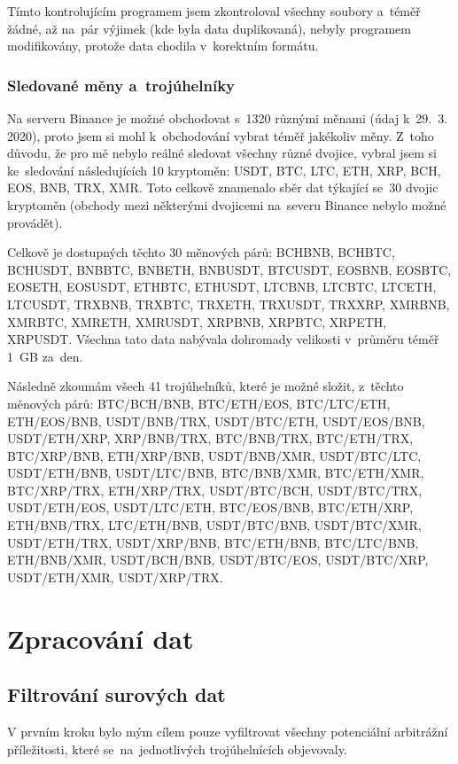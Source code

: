 \documentclass[thesis=B,czech]{FITthesis}[2019/03/21]
\begin{document}
Tímto kontrolujícím programem jsem zkontroloval všechny soubory a~téměř žádné, až na~pár výjimek (kde byla data duplikovaná), nebyly programem modifikovány, protože data chodila v~korektním formátu.

\subsubsection{Sledované měny a~trojúhelníky}
Na serveru Binance je možné obchodovat s~1320 různými měnami (údaj k~29.~3. 2020), proto jsem si mohl k~obchodování vybrat téměř jakékoliv měny. Z~toho důvodu, že pro mě nebylo reálné sledovat všechny různé dvojice, vybral jsem si ke~sledování následujících 10 kryptoměn: USDT, BTC, LTC, ETH, XRP, BCH, EOS, BNB, TRX, XMR. Toto celkově znamenalo sběr dat týkající se~30 dvojic kryptoměn (obchody mezi některými dvojicemi na~severu Binance nebylo možné provádět).

Celkově je dostupných těchto 30 měnových párů: BCHBNB, BCHBTC, BCHUSDT, BNBBTC, BNBETH, BNBUSDT, BTCUSDT, EOSBNB,  \linebreak EOSBTC, EOSETH, EOSUSDT, ETHBTC, ETHUSDT, LTCBNB, LTCBTC, LTCETH, LTCUSDT, TRXBNB, TRXBTC, TRXETH, TRXUSDT,  \linebreak TRXXRP, XMRBNB, XMRBTC, XMRETH, XMRUSDT, XRPBNB,  \linebreak XRPBTC, XRPETH, XRPUSDT. Všechna tato data nabývala dohromady velikosti v~průměru téměř 1~GB za~den.

Následně zkoumám všech 41 trojúhelníků, které je možné složit, z~těchto měnových párů: BTC/BCH/BNB, BTC/ETH/EOS, BTC/LTC/ETH,  \linebreak ETH/EOS/BNB, USDT/BNB/TRX, USDT/BTC/ETH, USDT/EOS/BNB, USDT/ETH/XRP, XRP/BNB/TRX, BTC/BNB/TRX, BTC/ETH/TRX,  \linebreak BTC/XRP/BNB, ETH/XRP/BNB, USDT/BNB/XMR, USDT/BTC/LTC, USDT/ETH/BNB, USDT/LTC/BNB, BTC/BNB/XMR, BTC/ETH/XMR, BTC/XRP/TRX, ETH/XRP/TRX, USDT/BTC/BCH, USDT/BTC/TRX, USDT/ETH/EOS, USDT/LTC/ETH, BTC/EOS/BNB, BTC/ETH/XRP,  \linebreak ETH/BNB/TRX, LTC/ETH/BNB, USDT/BTC/BNB, USDT/BTC/XMR, USDT/ETH/TRX, USDT/XRP/BNB, BTC/ETH/BNB, BTC/LTC/BNB, ETH/BNB/XMR, USDT/BCH/BNB, USDT/BTC/EOS, USDT/BTC/XRP, USDT/ETH/XMR, USDT/XRP/TRX.

\section{Zpracování dat}
\subsection{Filtrování surových dat}
V prvním kroku bylo mým cílem pouze vyfiltrovat všechny potenciální arbitrážní příležitosti, které se~na~jednotlivých trojúhelnících objevovaly.
\end{document}
